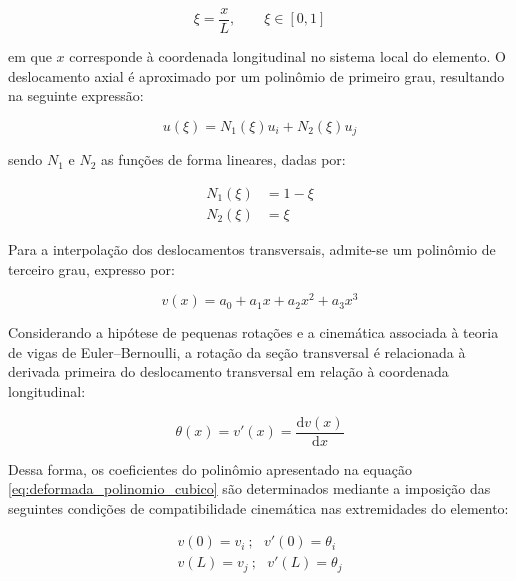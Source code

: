 \begin{equation}
    \xi = \frac{x}{L},
    \qquad \xi \in [0,1]
    \label{eq:deformada_coordenada_adimensional}
\end{equation}

\noindent
em que $x$ corresponde à coordenada longitudinal no sistema local do elemento. O deslocamento axial é aproximado por um polinômio de primeiro grau, resultando na seguinte expressão:

\begin{equation}
    u(\xi) = N_1(\xi)u_i + N_2(\xi)u_j
    \label{eq:deformada_interpolacao_axial}
\end{equation}

\noindent
sendo $N_1$ e $N_2$ as funções de forma lineares,
dadas por:

\begin{equation}
    \begin{aligned}
        N_1(\xi) &= 1-\xi \\
        N_2(\xi) &= \xi
    \end{aligned}
    \label{eq:deformada_funcoes_lineares}
\end{equation}

Para a interpolação dos deslocamentos transversais, admite-se um polinômio de terceiro grau, expresso por:

\begin{equation}
    v(x) = a_0+a_1x+a_2x^2+a_3x^3
    \label{eq:deformada_polinomio_cubico}
\end{equation}

Considerando a hipótese de pequenas rotações e a cinemática associada à teoria de vigas de Euler--Bernoulli, a rotação da seção transversal é relacionada à derivada primeira do deslocamento transversal em relação à coordenada longitudinal:

\begin{equation}
    \theta(x) = v'(x) = \frac{\mathrm{d}v(x)}{\mathrm{d}x}
    \label{eq:deformada_rotacao}
\end{equation}

Dessa forma, os coeficientes do polinômio apresentado na equação \eqref{eq:deformada_polinomio_cubico} são determinados mediante a imposição das seguintes condições de compatibilidade cinemática nas extremidades do elemento:

\begin{equation}
    \begin{aligned}
        v(0) = v_i~; ~~~ v'(0) = \theta_i \\
        v(L) = v_j~; ~~~ v'(L) = \theta_j
    \end{aligned}
    \label{eq:deformada_condicoes_contorno}
\end{equation}

